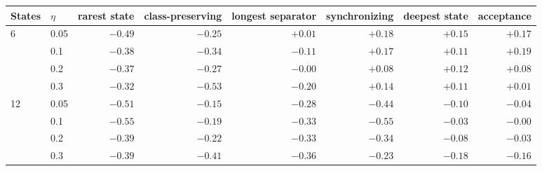 \begin{tabular}{llrrrrrr}
\toprule
States & $\eta$ & rarest state & class-preserving & longest separator & synchronizing & deepest state & acceptance \\
\midrule
\multirow{4}{*}{6} & 0.05 & $-0.49$ & $-0.25$ & $+0.01$ & $+0.18$ & $+0.15$ & $+0.17$ \\
 & 0.1 & $-0.38$ & $-0.34$ & $-0.11$ & $+0.17$ & $+0.11$ & $+0.19$ \\
 & 0.2 & $-0.37$ & $-0.27$ & $-0.00$ & $+0.08$ & $+0.12$ & $+0.08$ \\
 & 0.3 & $-0.32$ & $-0.53$ & $-0.20$ & $+0.14$ & $+0.11$ & $+0.01$ \\
\midrule
\multirow{4}{*}{12} & 0.05 & $-0.51$ & $-0.15$ & $-0.28$ & $-0.44$ & $-0.10$ & $-0.04$ \\
 & 0.1 & $-0.55$ & $-0.19$ & $-0.33$ & $-0.55$ & $-0.03$ & $-0.00$ \\
 & 0.2 & $-0.39$ & $-0.22$ & $-0.33$ & $-0.34$ & $-0.08$ & $-0.03$ \\
 & 0.3 & $-0.39$ & $-0.41$ & $-0.36$ & $-0.23$ & $-0.18$ & $-0.16$ \\
\bottomrule
\end{tabular}
